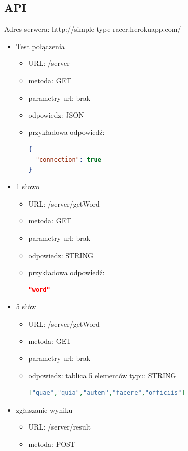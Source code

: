 \documentclass[12pt,a4paper]{article}
\begin{document}
\subsection{API}
Adres serwera: http://simple-type-racer.herokuapp.com/
\begin{itemize}
    \item Test połączenia
    \begin{itemize}
        \item URL: /server
        \item metoda: GET
        \item parametry url: brak
        \item odpowiedz: JSON
        \item przykładowa odpowiedź: \begin{lstlisting}[language=json,firstnumber=1]
{
  "connection": true
}
\end{lstlisting}
    \end{itemize}
    \item 1 słowo
    \begin{itemize}
        \item URL: /server/getWord
        \item metoda: GET
        \item parametry url: brak
        \item odpowiedz: STRING
        \item przykładowa odpowiedź:
        \begin{lstlisting}[language=json,firstnumber=1]
"word"
\end{lstlisting}
    \end{itemize}
    \item 5 słów
    \begin{itemize}
        \item URL: /server/getWord
        \item metoda: GET
        \item parametry url: brak
        \item odpowiedz: tablica 5 elementów typu: STRING
        \begin{lstlisting}[language=json,firstnumber=1]
["quae","quia","autem","facere","officiis"]
\end{lstlisting}
    \end{itemize}
    \item zgłaszanie wyniku
    \begin{itemize}
        \item URL: /server/result
        \item metoda: POST

\end{itemize}
\end{itemize}
\end{document}
